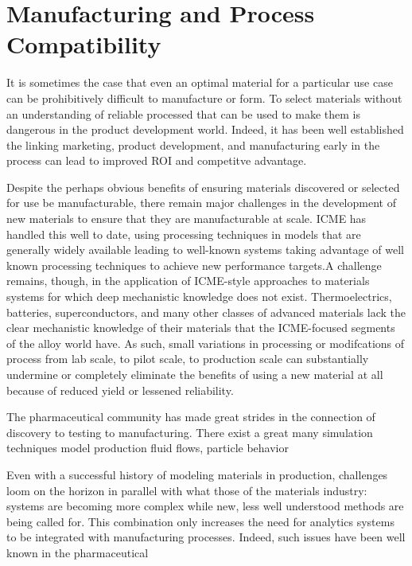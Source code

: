 

\section{Manufacturing and Process Compatibility}
It is sometimes the case that even an optimal material for a particular use case can be prohibitively difficult to manufacture or form. To select materials without an understanding of reliable processed that can be used to make them is dangerous in the product development world. Indeed, it has been well established the linking marketing, product development, and manufacturing early in the process can lead to improved ROI and competitve advantage\cite{Swink2007203}.

Despite the perhaps obvious benefits of ensuring materials discovered or selected for use be manufacturable, there remain major challenges in the development of new materials to ensure that they are manufacturable at scale. ICME has handled this well to date, using processing techniques in models that are generally widely available leading to well-known systems taking advantage of well known processing techniques to achieve new performance targets.A challenge remains, though, in the application of ICME-style approaches to materials systems for which deep mechanistic knowledge does not exist. Thermoelectrics, batteries, superconductors, and many other classes of advanced materials lack the clear mechanistic knowledge of their materials that the ICME-focused segments of the alloy world have. As such, small variations in processing or modifcations of process from lab scale, to pilot scale, to production scale can substantially undermine or completely eliminate the benefits of using a new material at all because of reduced yield or lessened reliability.

The pharmaceutical community has made great strides in the connection of discovery to testing to manufacturing. There exist a great many simulation techniques model production fluid flows, particle behavior

Even with a successful history of modeling materials in production, challenges loom on the horizon in parallel with what those of the materials industry: systems are becoming more complex while new, less well understood methods are being called for. This combination only increases the need for analytics systems to be integrated with manufacturing processes\cite{JPS:JPS24594}. Indeed, such issues have been well known in the pharmaceutical


